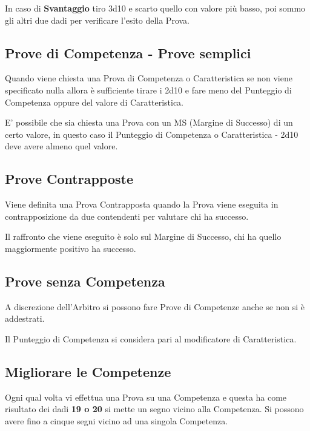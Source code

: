 \documentclass[12pt,a4paper,twoside,openany]{book}
\begin{document}
\begin{multicols}{2}
In caso di \textbf{Svantaggio} tiro 3d10 e scarto quello con valore più basso, poi sommo gli altri due dadi per verificare l'esito della Prova. 

\subsection{Prove di Competenza - Prove semplici}

Quando viene chiesta una Prova di Competenza o Caratteristica se non viene specificato nulla allora è sufficiente tirare i 2d10 e fare meno del Punteggio di Competenza oppure del valore di Caratteristica.

E' possibile che sia chiesta una Prova con un MS (Margine di Successo) di un certo valore, in questo caso il Punteggio di Competenza o Caratteristica - 2d10 deve avere almeno quel valore.

\subsection{Prove Contrapposte}

Viene definita una Prova Contrapposta quando la Prova viene eseguita in contrapposizione da due contendenti per valutare chi ha successo.

Il raffronto che viene eseguito è solo sul Margine di Successo, chi ha quello maggiormente positivo ha successo.

\subsection{Prove senza Competenza}

A discrezione dell'Arbitro si possono fare Prove di Competenze anche se non si è addestrati.

Il Punteggio di Competenza si considera pari al modificatore di Caratteristica.

\subsection{Migliorare le Competenze}\hypertarget{Migliorare le Competenze}{} \label{Migliorare le Competenze}

Ogni qual volta vi effettua una Prova su una Competenza e questa ha come risultato dei dadi \textbf{19 o 20} si mette un segno vicino alla Competenza. Si possono avere fino a cinque segni vicino ad una singola Competenza.


\end{multicols}
\end{document}
